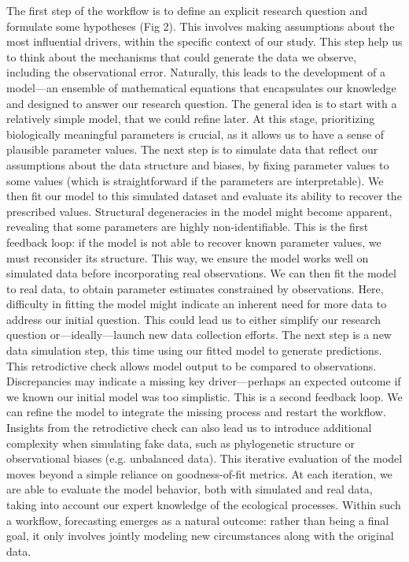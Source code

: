 \documentclass[11pt]{article}
\begin{document}
The first step of the workflow is to define an explicit research question and formulate some hypotheses (Fig 2). This involves making assumptions about the most influential drivers, within the specific context of our study. This step help us to think about the mechanisms that could generate the data we observe, including the observational error. Naturally, this leads to the development of a model---an ensemble of mathematical equations that encapsulates our knowledge and designed to answer our research question. The general idea is to start with a relatively simple model, that we could refine later. At this stage, prioritizing biologically meaningful parameters is crucial, as it allows us to have a sense of plausible parameter values. The next step is to simulate data that reflect our assumptions about the data structure and biases, by fixing parameter values to some values (which is straightforward if the parameters are interpretable). We then fit our model to this simulated dataset and evaluate its ability to recover the prescribed values. 
Structural degeneracies in the model might become apparent, revealing that some parameters are highly non-identifiable. This is the first feedback loop: if the model is not able to recover known parameter values, we must reconsider its structure. This way, we ensure the model works well on simulated data before incorporating real observations. We can then fit the model to real data, to obtain parameter estimates constrained by observations. Here, difficulty in fitting the model might indicate an inherent need for more data to address our initial question. This could lead us to either simplify our research question or---ideally---launch new data collection efforts. The next step is a new data simulation step, this time using our fitted model to generate predictions. This retrodictive check allows model output to be compared to observations. Discrepancies may indicate a missing key driver---perhaps an expected outcome if we known our initial model was too simplistic. This is a second feedback loop. We can refine the model to integrate the missing process and restart the workflow. Insights from the retrodictive check can also lead us to introduce additional complexity when simulating fake data, such as phylogenetic structure or observational biases (e.g. unbalanced data). This iterative evaluation of the model moves beyond a simple reliance on goodness-of-fit metrics. At each iteration, we are able to evaluate the model behavior, both with simulated and real data, taking into account our expert knowledge of the ecological processes. Within such a workflow, forecasting emerges as a natural outcome: rather than being a final goal, it only involves jointly modeling new circumstances along with the original data.
\end{document}
